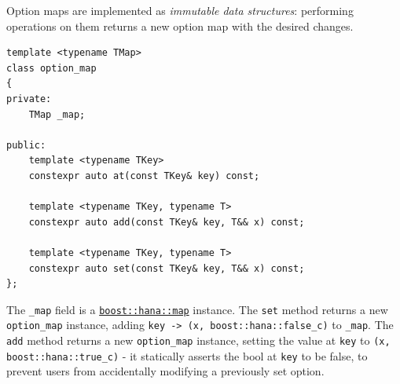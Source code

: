 \documentclass[twoside, 12pt, a4paper, openright]{book}
\begin{document}
Option maps are implemented as \emph{immutable data structures}:
performing operations on them returns a new option map with the desired
changes.

\begin{verbatim}
template <typename TMap>
class option_map
{
private:
    TMap _map;

public:
    template <typename TKey>
    constexpr auto at(const TKey& key) const;

    template <typename TKey, typename T>
    constexpr auto add(const TKey& key, T&& x) const;

    template <typename TKey, typename T>
    constexpr auto set(const TKey& key, T&& x) const;
};
\end{verbatim}

The
\texttt{_map}
field is a
\href{http://www.boost.org/doc/libs/1_61_0/libs/hana/doc/html/structboost_1_1hana_1_1map.html}{\texttt{boost::hana::map}}
instance. The
\texttt{set}
method returns a new
\texttt{option_map}
instance, adding
\texttt{key -> (x, boost::hana::false_c)}
to
\texttt{_map}.
The
\texttt{add}
method returns a new
\texttt{option_map}
instance, setting the value at
\texttt{key}
to
\texttt{(x, boost::hana::true_c)}
- it statically asserts the bool at
\texttt{key}
to be false, to prevent users from accidentally modifying a previously
set option.
\end{document}
